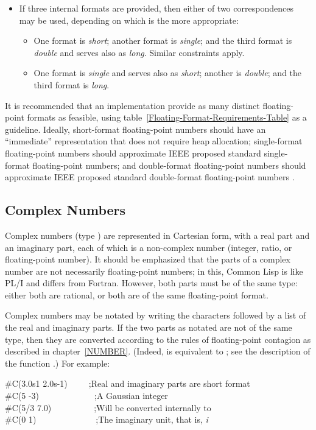 {\begin{itemize}
\item
If three internal formats are provided, then either of two correspondences
may be used, depending on which is the more appropriate:
\begin{itemize}
\item
One format is {\it short}; another format is {\it single}; and the third format is
{\it double} and serves also as {\it long}.  Similar constraints apply.

\item
One format is {\it single} and serves also as {\it short};
another is {\it double}; and the third format is {\it long}.
\end{itemize}
\end{itemize}

\beforenoterule
\begin{implementation}
It is recommended that an implementation
provide as many distinct floating-point formats as feasible,
using table~\ref{Floating-Format-Requirements-Table} as a guideline.
Ideally, short-format floating-point numbers should have an
``immediate'' representation that does not require heap allocation;
single-format
floating-point numbers should approximate IEEE proposed standard
single-format floating-point numbers; and double-format floating-point
numbers should approximate IEEE proposed standard double-format
floating-point numbers
\cite{IEEE-PROPOSED-FLOATING-POINT-STANDARD,IEEE-FLOATING-POINT-IMPL-GUIDE,IEEE-FLOATING-POINT-IMPL-GUIDE-ERRATA}.
\end{implementation}
\afternoterule


\subsection{Complex Numbers}

Complex numbers (type )
are represented in Cartesian form, with a real part and an imaginary
part, each of which is a non-complex number (integer, ratio, or floating-point
number).  It should be emphasized that the parts of a complex
number are not necessarily floating-point numbers; in this, Common Lisp
is like PL/I and differs from Fortran.  However, both parts must
be of the same type: either both are rational, or both are of the
same floating-point format.

Complex numbers may be notated by writing the characters 
followed by a list of the real and imaginary parts.
If the two parts as notated are not of the same type, then
they are converted according to the rules of floating-point contagion
as described in chapter~\ref{NUMBER}.
(Indeed,  is equivalent to ;
see the description of the function .)
For example:
\begin{lisp}
\#C(3.0s1 2.0s-1)~~~~~;{\rm Real and imaginary parts are short format}\\
\#C(5 -3)~~~~~~~~~~~~~;{\rm A Gaussian integer} \\
\#C(5/3 7.0)~~~~~~~~~~;{\rm Will be converted internally to } \\
\#C(0 1)~~~~~~~~~~~~~~;{\rm The imaginary unit, that is, {\it i}}
\end{lisp}

}
